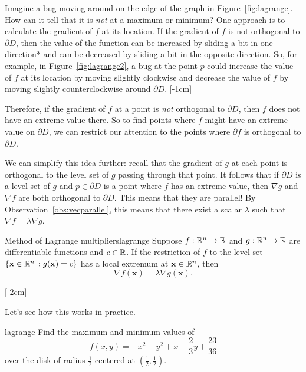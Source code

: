 \documentclass[svgnames]{watsonbook}
\begin{document}
  Imagine a bug moving around on the edge of the graph in
  Figure~\ref{fig:lagrange}. How can it tell that it is \textit{not} at a
  maximum or minimum? One approach is to calculate the gradient of $f$
  at its location. If the gradient of $f$ is not orthogonal to
  $\partial D$, then the value of the function can be increased by
  sliding a bit in one direction* and can be decreased by sliding a bit
  in the opposite direction. So, for example, in
  Figure~\ref{fig:lagrange2}, a bug at the point $p$ could increase
  the value of $f$ at its location by moving slightly clockwise and
  decrease the value of $f$ by moving slightly counterclockwise around
  $\partial D$. [-1cm]

  Therefore, if the gradient of $f$ at a point is \textit{not}
  orthogonal to $\partial D$, then $f$ does not have an extreme
  value there. So to find points where $f$ might have an extreme value
  on $\partial D$, we can restrict our attention to the points where
  $\partial f$ is orthogonal to $\partial D$.

  We can simplify this idea further: recall that the gradient of $g$ at
  each point is orthogonal to the level set of $g$ passing through
  that point. It follows that if $\partial D$ is a level set of $g$ 
  and $p \in \partial D$ is a point where $f$ has an extreme value, then
  $\nabla g$ and $\nabla f$ are both orthogonal to $\partial
  D$. This means that they are parallel! By
  Observation~\ref{obs:vecparallel}, this means that there exist a scalar
  $\lambda$ such that $\nabla f = \lambda \nabla g$.

  \begin{theo}{Method of Lagrange multipliers}{lagrange}
    Suppose $f: \mathbb{R}^n \to \mathbb{R}$ and $g:\mathbb{R}^n \to \mathbb{R}$ are differentiable
    functions and $c \in \mathbb{R}$. If the restriction of $f$ to the level
    set $\{\mathbf{x} \in \mathbb{R}^n \,: g(\mathbf{x}) = c\}$ has a local
    extremum at $\mathbf{x} \in \mathbb{R}^n$, then
    \[
      \nabla f (\mathbf{x}) = \lambda \nabla g (\mathbf{x}). 
    \]
  \end{theo} [-2cm]

  Let's see how this works in practice.

  \begin{example}{}{lagrange}
    Find the maximum and minimum values of
    \[f(x,y) = -x^2 - y^2 + x + \frac{2}{3} y + \frac{23}{36}\]
    over the disk of radius $\tfrac{1}{2}$ centered at $\left(
      \tfrac{1}{2}, \tfrac{1}{2}\right)$. 
  \end{example}
\end{document}

